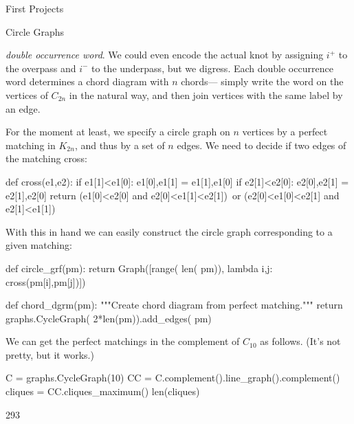 \begin{chap}{First Projects}
\begin{sect}{Circle Graphs}
\begin{para}
\textsl{double occurrence word}. We could even encode the actual knot by
assigning $i^+$ to the overpass and $i^-$ to the underpass, but we digress.
Each double occurrence word determines a chord diagram with $n$ chords---
simply write the word on the vertices of $C_{2n}$ in the natural way, and then
join vertices with the same label by an edge.
\end{para}
%
\begin{para}
For the moment at least, we specify a circle graph on $n$ vertices by a 
perfect matching in $K_{2n}$, and thus by a set of $n$ edges.
We need to decide if two edges of the matching cross:
\end{para}
%
\begin{sagecode}
\begin{sageinput}
def cross(e1,e2):
    if e1[1]<e1[0]: e1[0],e1[1] = e1[1],e1[0]
    if e2[1]<e2[0]: e2[0],e2[1] = e2[1],e2[0]
    return (e1[0]<e2[0] and e2[0]<e1[1]<e2[1])\
      or (e2[0]<e1[0]<e2[1] and e2[1]<e1[1])
\end{sageinput}
\end{sagecode}
%
\begin{para}
With this in hand we can easily construct the circle graph corresponding
to a given matching:
\end{para}
%
\begin{sagecode}
\begin{sageinput}
def circle_grf(pm):
    return Graph([range( len( pm)), lambda i,j: cross(pm[i],pm[j])])
\end{sageinput}
\end{sagecode}
%
\begin{sagecode}
\begin{sageinput}
def chord_dgrm(pm):
    """Create chord diagram from perfect matching."""
    return graphs.CycleGraph( 2*len(pm)).add_edges( pm)
\end{sageinput}
\end{sagecode}
%
\begin{para}
We can get the perfect matchings in the complement of $C_{10}$ as follows.
(It's not pretty, but it works.)
\end{para}
%
\begin{sagecode}
\begin{sageinput}
C = graphs.CycleGraph(10)
CC = C.complement().line_graph().complement()
cliques = CC.cliques_maximum()
len(cliques)
\end{sageinput}
\begin{sageoutput}
293
\end{sageoutput}

\end{sagecode}
\end{sect}
\end{chap}
